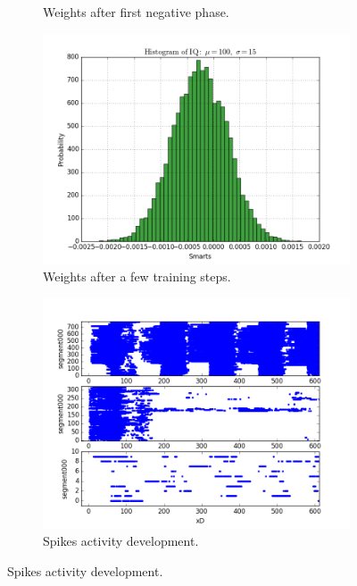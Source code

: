 \begin{figure}[h!]
\begin{subfigure}[t]{.24\textwidth}
  		\caption{Weights after first negative phase.}
  		\label{fig:sub2}
	\end{subfigure}
	\begin{subfigure}[t]{.24\textwidth}
  		\centering
  		\includegraphics[width=.9\linewidth]{imgs/app/nest/w_hist_conv4.png}
  		\caption{Weights after a few training steps.}
  		\label{fig:sub2}
	\end{subfigure}
	

	\begin{subfigure}[t]{.24\textwidth}
  		\centering
  		\includegraphics[width=.9\linewidth]{imgs/app/nest/spikes_conv.png}
  		\caption{Spikes activity development.}
  		\label{fig:sub2}
	\end{subfigure}
	

\end{figure}

